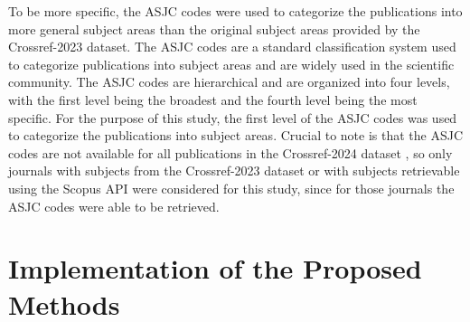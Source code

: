 To be more specific, the ASJC codes were used to categorize the publications
into more general subject areas than the original subject areas provided by the
Crossref-2023 dataset. The ASJC codes are a standard classification system used
to categorize publications into subject areas and are widely used in the
scientific community. The ASJC codes are hierarchical and are organized into
four levels, with the first level being the broadest and the fourth level being
the most specific. For the purpose of this study, the first level of the ASJC
codes was used to categorize the publications into subject areas. Crucial to
note is that the ASJC codes are not available for all publications in the
Crossref-2024 dataset \cite{crossrefSubjectCodes2024}, so only journals with
subjects from the Crossref-2023 dataset or with subjects retrievable using the
Scopus API were considered for this study, since for those journals the ASJC
codes were able to be retrieved.

\section{Implementation of the Proposed Methods}
%
%
%
%

